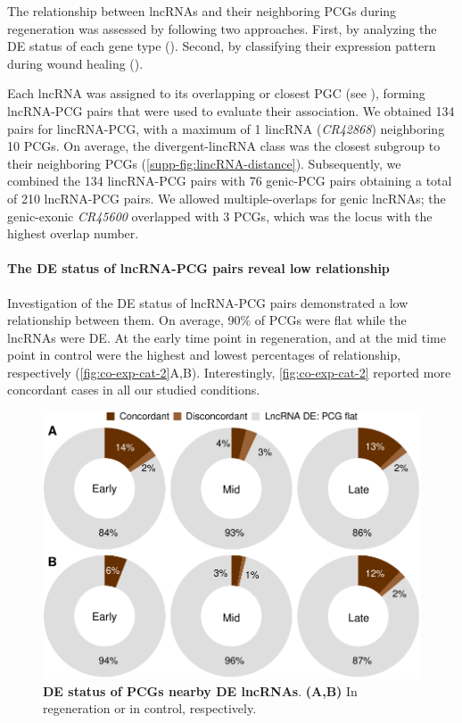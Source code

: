 The relationship between lncRNAs and their neighboring PCGs during regeneration was assessed by following two approaches. First, by analyzing the DE status of each gene type (). Second, by classifying their expression pattern during wound healing ().

Each lncRNA was assigned to its overlapping or closest PGC (see ), forming lncRNA-PCG pairs that were used to evaluate their association. We obtained 134 pairs for lincRNA-PCG, with a maximum of 1 lincRNA (\textit{CR42868}) neighboring 10 PCGs. On average, the divergent-lincRNA class was the closest subgroup to their neighboring PCGs (\autoref{supp-fig:lincRNA-distance}). Subsequently, we combined the 134 lincRNA-PCG pairs with 76 genic-PCG pairs obtaining a total of 210 lncRNA-PCG pairs. We allowed multiple-overlaps for genic lncRNAs; the genic-exonic \textit{CR45600} overlapped with 3 PCGs, which was the locus with the highest overlap number.

\paragraph{The DE status of lncRNA-PCG pairs reveal low relationship}
\label{paragraph:de-status}

Investigation of the DE status of lncRNA-PCG pairs demonstrated a low relationship between them. On average, 90\% of PCGs were flat while the lncRNAs were DE. At the early time point in regeneration, and at the mid time point in control were the highest and lowest percentages of relationship, respectively (\autoref{fig:co-exp-cat-2}A,B). Interestingly, \autoref{fig:co-exp-cat-2} reported more concordant cases in all our studied conditions.

\begin{figure}[ht!]
  \centering
  \includegraphics[scale=0.55]{plots/results/dme/co.expression.cat.pdf}
  \caption[DE status of PCGs nearby DE lncRNAs]{\textbf{DE status of PCGs nearby DE lncRNAs}. \textbf{(A,B)} In regeneration or in control, respectively.}
  \label{fig:co-exp-cat-2}
\end{figure}

